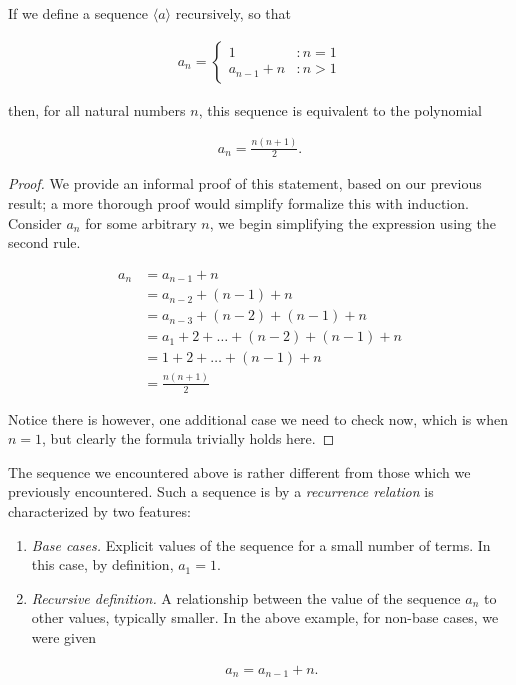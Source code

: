 \vspace{\baselineskip}
\begin{theorem}
	If we define a sequence $\langle a \rangle$ recursively, so that
	
	\begin{align*}
		a_n =
		\begin{cases}
			1 &: n = 1 \\
			a_{n - 1} + n &: n > 1
		\end{cases}
	\end{align*}
	
	then, for all natural numbers $n$, this sequence is equivalent to the polynomial
	
	\begin{align}
		a_n = \frac{n(n + 1)}{2}.
	\end{align}
\end{theorem}
\begin{proof}
	We provide an informal proof of this statement, based on our previous result; a more thorough proof would simplify formalize this with induction. Consider $a_n$ for some arbitrary $n$, we begin simplifying the expression using the second rule.
	
	\begin{align*}
		a_n &= a_{n - 1} + n \\
		&= a_{n - 2} + (n - 1) + n \\
		&= a_{n - 3} + (n - 2) + (n - 1) + n \\
		&= a_1 + 2 + \dots + (n - 2) + (n - 1) + n \\
		&= 1 + 2 + \dots + (n - 1) + n \\
		&= \frac{n (n + 1)}{2}
	\end{align*}
	
	Notice there is however, one additional case we need to check now, which is when $n = 1$, but clearly the formula trivially holds here.
\end{proof}
\vspace{\baselineskip}

The sequence we encountered above is rather different from those which we previously encountered. Such a sequence is by a \emph{recurrence relation} is characterized by two features:

\begin{enumerate}
	\item \emph{Base cases.} Explicit values of the sequence for a small number of terms. In this case, by definition, $a_1 = 1$.
	\item \emph{Recursive definition.} A relationship between the value of the sequence $a_n$ to other values, typically smaller. In the above example, for non-base cases, we were given
	
	\begin{align*}
		a_n = a_{n - 1} + n.
	\end{align*}
\end{enumerate}

